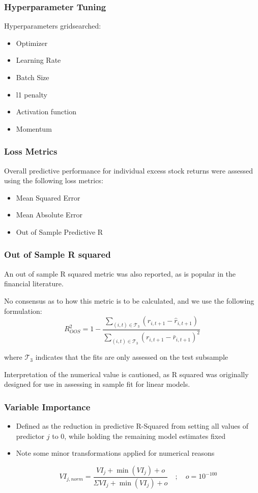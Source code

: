 \documentclass[aspectratio=169]{beamer}
\begin{document}
\begin{frame}
\frametitle{Hyperparameter Tuning}
Hyperparameters gridsearched:
\begin{itemize}
	\item Optimizer
	\item Learning Rate
	\item Batch Size
	\item l1 penalty
	\item Activation function
	\item Momentum
\end{itemize}
\end{frame}


\begin{frame}
\frametitle{Loss Metrics}
Overall predictive performance for individual excess stock returns were assessed using the following loss metrics:
	\begin{itemize}
	\item Mean Squared Error
	\item Mean Absolute Error
	\item Out of Sample Predictive R
	\end{itemize}
\end{frame}
	
\begin{frame}
\frametitle{Out of Sample R squared}
		
An out of sample R squared metric was also reported, as is popular in the financial literature. 

No consensus as to how this metric is to be calculated, and we use the following formulation:
\begin{equation}
R^2_{OOS} = 
	1 - 
	\frac{\sum_{(i, t)\in\mathcal{T}_3}(r_{i, t+1} - \widehat{r}_{i, t+1})}
	{\sum_{(i, t)\in\mathcal{T}_3} \left( r_{i, t+1} - \bar{r}_{i, t+1} \right) ^2}
\end{equation}
		
where $\mathcal{T}_3$ indicates that the fits are only assessed on the test subsample
		
Interpretation of the numerical value is cautioned, as R squared was originally designed for use in assessing in sample fit for linear models.
\end{frame}
	
\begin{frame}
\frametitle{Variable Importance}	
\begin{itemize}
	\item Defined as the reduction in predictive R-Squared from setting all values of predictor $j$ to 0, while holding the remaining model estimates fixed
	\item Note some minor transformations applied for numerical reasons
			
	\begin{equation}
	VI_{j, norm} = \frac{VI_j + \operatorname{min}(VI_j) + o}
	{\Sigma VI_j + \operatorname{min}(VI_j) + o} \quad ; \quad o = 10^{-100}
		\end{equation}
	\end{itemize}
\end{frame}
\end{document}
